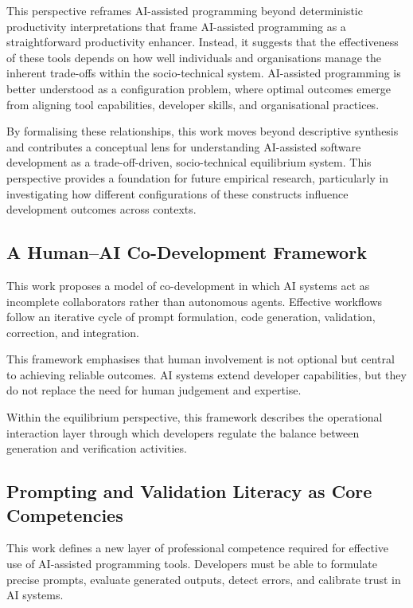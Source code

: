 \documentclass[conference]{IEEEtran}
\begin{document}
This perspective reframes AI-assisted programming beyond deterministic productivity interpretations that frame AI-assisted programming as a straightforward productivity enhancer. Instead, it suggests that the effectiveness of these tools depends on how well individuals and organisations manage the inherent trade-offs within the socio-technical system. AI-assisted programming is better understood as a configuration problem, where optimal outcomes emerge from aligning tool capabilities, developer skills, and organisational practices.

By formalising these relationships, this work moves beyond descriptive synthesis and contributes a conceptual lens for understanding AI-assisted software development as a trade-off-driven, socio-technical equilibrium system. This perspective provides a foundation for future empirical research, particularly in investigating how different configurations of these constructs influence development outcomes across contexts.

\subsection{A Human--AI Co-Development Framework}

This work proposes a model of co-development in which AI systems act as incomplete collaborators rather than autonomous agents. Effective workflows follow an iterative cycle of prompt formulation, code generation, validation, correction, and integration.

This framework emphasises that human involvement is not optional but central to achieving reliable outcomes. AI systems extend developer capabilities, but they do not replace the need for human judgement and expertise.

Within the equilibrium perspective, this framework describes the operational interaction layer through which developers regulate the balance between generation and verification activities.

\subsection{Prompting and Validation Literacy as Core Competencies}

This work defines a new layer of professional competence required for effective use of AI-assisted programming tools. Developers must be able to formulate precise prompts, evaluate generated outputs, detect errors, and calibrate trust in AI systems.
\end{document}
